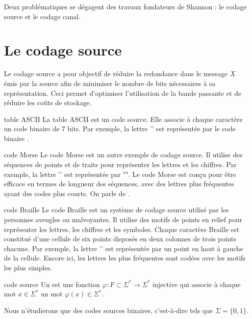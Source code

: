 Deux problématiques se dégagent des travaux fondateurs de Shannon : le codage source et le codage canal.

\section{Le codage source}
Le codage source a pour objectif de réduire la redondance dans le message $X$ émis par la source afin de minimiser le nombre de bits nécessaires à sa représentation. Ceci permet d'optimiser l'utilisation de la bande passante et de réduire les coûts de stockage.

\begin{exemple}{}{table ASCII}
    La table ASCII est un code source. Elle associe à chaque caractère un code binaire de 7 bits. Par exemple, la lettre '' est représentée par le code binaire .
\end{exemple}

\begin{exemple}{}{code Morse}
    Le code Morse est un autre exemple de codage source. Il utilise des séquences de points et de traits pour représenter les lettres et les chiffres. Par exemple, la lettre '' est représentée par "". Le code Morse est conçu pour être efficace en termes de longueur des séquences, avec des lettres plus fréquentes ayant des codes plus courts. On parle de .
\end{exemple}

\begin{exemple}{}{code Braille}
    Le code Braille est un système de codage source utilisé par les personnes aveugles ou malvoyantes. Il utilise des motifs de points en relief pour représenter les lettres, les chiffres et les symboles. Chaque caractère Braille est constitué d'une cellule de six points disposés en deux colonnes de trois points chacune. Par exemple, la lettre '' est représentée par un point en haut à gauche de la cellule. Encore ici, les lettres les plus fréquentes sont codées avec les motifs les plus simples.
\end{exemple}

\begin{definition}{}{code source}
    Un  est une fonction $\varphi : F \subset \Sigma^* \to \Sigma^*  $ injective qui associe à chaque mot $x \in \Sigma^*$  un mot $\varphi(x) \in \Sigma^*$.
\end{definition}
Nous n'étudierons que des codes sources binaires, c'est-à-dire tels que $\Sigma = \{0,1\}$.

